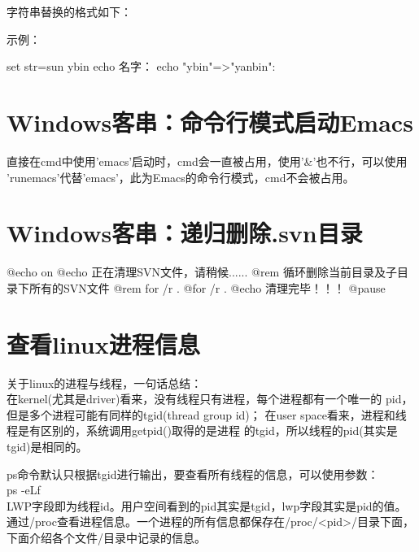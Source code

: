 ﻿\documentclass[a4paper,11pt]{article}
\begin{document}
  字符串替换的格式如下：

  \begin{bashcode}
  \end{bashcode}

  示例：

  \begin{bashcode}
    set str=sun ybin
    echo 名字：%
    echo "ybin"=>"yanbin": %
  \end{bashcode}

  \section[Windows客串：命令行模式启动Emacs]{Windows客串：命令行模式启动Emacs}
  直接在cmd中使用'emacs'启动时，cmd会一直被占用，使用'\&'也不行，可以使用
  'runemacs'代替'emacs'，此为Emacs的命令行模式，cmd不会被占用。

  \section[Windows客串：递归删除.svn目录]{Windows客串：递归删除.svn目录}
  \begin{bashcode}
    @echo on
    @echo 正在清理SVN文件，请稍候......
    @rem 循环删除当前目录及子目录下所有的SVN文件
    @rem for /r . %
    @for /r . %
    @echo 清理完毕！！！
    @pause
  \end{bashcode}


  \section[查看linux进程信息]{查看linux进程信息}
  关于linux的进程与线程，一句话总结：\\
  在kernel(尤其是driver)看来，没有线程只有进程，每个进程都有一个唯一的
  pid，但是多个进程可能有同样的tgid(thread group id)；
  在user space看来，进程和线程是有区别的，系统调用getpid()取得的是进程
  的tgid，所以线程的pid(其实是tgid)是相同的。

  ps命令默认只根据tgid进行输出，要查看所有线程的信息，可以使用参数：\\
  ps -eLf\\
  LWP字段即为线程id。用户空间看到的pid其实是tgid，lwp字段其实是pid的值。\\[10pt]

  通过/proc查看进程信息。一个进程的所有信息都保存在/proc/<pid>/目录下面，
  下面介绍各个文件/目录中记录的信息。
\end{document}
